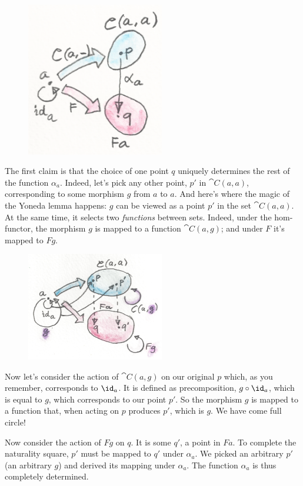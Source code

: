 \begin{figure}[H]
\centering
\includegraphics[width=60mm]{images/yoneda3.png}
\end{figure}

\noindent
The first claim is that the choice of one point $q$ uniquely
determines the rest of the function $\alpha_a$. Indeed, let's pick any
other point, $p'$ in $\cat{C}(a, a)$, corresponding to
some morphism $g$ from $a$ to $a$. And here's where
the magic of the Yoneda lemma happens: $g$ can be viewed as a
point $p'$ in the set $\cat{C}(a, a)$. At the same time,
it selects two \emph{functions} between sets. Indeed, under the
hom-functor, the morphism $g$ is mapped to a function
$\cat{C}(a, g)$; and under $F$ it's mapped to $F g$.

\begin{figure}[H]
\centering
\includegraphics[width=60mm]{images/yoneda4.png}
\end{figure}

\noindent
Now let's consider the action of $\cat{C}(a, g)$ on our original
$p$ which, as you remember, corresponds to $\id_a$. It is
defined as precomposition, $g \circ \id_a$, which is equal to $g$,
which corresponds to our point $p'$. So the morphism
$g$ is mapped to a function that, when acting on $p$
produces $p'$, which is $g$. We have come full
circle!

Now consider the action of $F g$ on $q$. It is some
$q'$, a point in $F a$. To complete the naturality
square, $p'$ must be mapped to $q'$ under
$\alpha_a$. We picked an arbitrary $p'$ (an arbitrary
$g$) and derived its mapping under $\alpha_a$. The function
$\alpha_a$ is thus completely determined.

